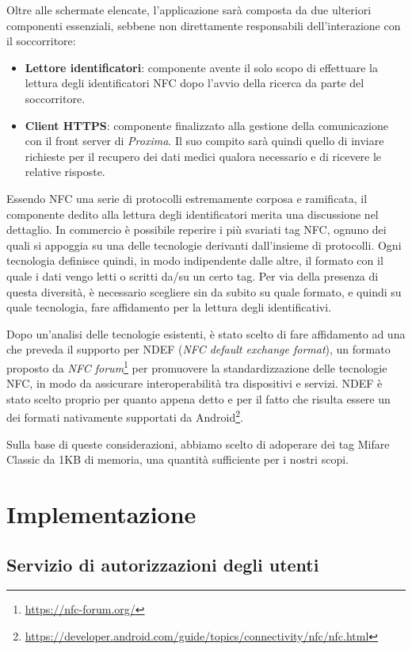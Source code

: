 \documentclass[a4paper,12pt]{report}
\begin{document}
Oltre alle schermate elencate, l'applicazione sarà composta da due ulteriori componenti essenziali, sebbene non direttamente responsabili dell'interazione con il soccorritore:
\begin{itemize}
	\item \textbf{Lettore identificatori}: componente avente il solo scopo di effettuare la lettura degli identificatori NFC dopo l'avvio della ricerca da parte del soccorritore.
	\item \textbf{Client HTTPS}: componente finalizzato alla gestione della comunicazione con il front server di \emph{Proxima}. Il suo compito sarà quindi quello di inviare richieste per il recupero dei dati medici qualora necessario e di ricevere le relative risposte.  
\end{itemize}

Essendo NFC una serie di protocolli estremamente corposa e ramificata, il componente dedito alla lettura degli identificatori merita una discussione nel dettaglio. In commercio è possibile reperire i più svariati tag NFC, ognuno dei quali si appoggia su una delle tecnologie derivanti dall'insieme di protocolli. Ogni tecnologia definisce quindi, in modo indipendente dalle altre, il formato con il quale i dati vengo letti o scritti da/su un certo tag. Per via della presenza di questa diversità, è necessario scegliere sin da subito su quale formato, e quindi su quale tecnologia, fare affidamento per la lettura degli identificativi.

Dopo un'analisi delle tecnologie esistenti, è stato scelto di fare affidamento ad una che preveda il supporto per NDEF (\emph{NFC default exchange format}), un formato proposto da \emph{NFC forum}\footnote{\url{https://nfc-forum.org/}} per promuovere la standardizzazione delle tecnologie NFC, in modo da assicurare interoperabilità tra dispositivi e servizi. NDEF è stato scelto proprio per quanto appena detto e per il fatto che risulta essere un dei formati nativamente supportati da Android\footnote{\url{https://developer.android.com/guide/topics/connectivity/nfc/nfc.html}}.

Sulla base di queste considerazioni, abbiamo scelto di adoperare dei tag Mifare Classic da 1KB di memoria, una quantità sufficiente per i nostri scopi.


\chapter{Implementazione}

\section{Servizio di autorizzazioni degli utenti}
\end{document}
